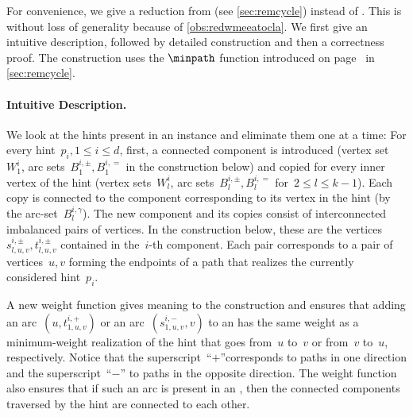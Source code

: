 For convenience, we give a reduction from \pWMEECLAs{} (see \autoref{sec:remcycle}) instead of \pWMEEAs{}. This is without loss of generality because of \autoref{obs:redwmeeatocla}. We first give an intuitive description, followed by detailed construction and then a correctness proof. The construction uses the $\minpath$ function introduced on page~\pageref{def:minpath} in \autoref{sec:remcycle}.

\paragraph{Intuitive Description.} We look at the hints present in an \pWMEECLAs{} instance and eliminate them one at a time: For every hint~$p_i, 1 \leq i \leq d$, first, a connected component is introduced (vertex set~$W^i_1$, arc sets~$B_1^{i,\pm}, B_1^{i,=}$ in the construction below) and copied for every inner vertex of the hint (vertex sets~$W^i_l$, arc sets~$B_l^{i,\pm}, B_l^{i,=}$ for~$2\leq l \leq k-1$). Each copy is connected to the component corresponding to its vertex in the hint (by the arc-set~$B_l^{i, \gamma}$). The new component and its copies consist of interconnected imbalanced pairs of vertices. In the construction below, these are the vertices~$s^{i,\pm}_{l, u,v},t^{i,\pm}_{l, u,v}$ contained in the~$i$-th component. Each pair corresponds to a pair of vertices~$u,v$ forming the endpoints of a path that realizes the currently considered hint~$p_i$.

 A new weight function gives meaning to the construction and ensures that adding an arc~$(u, t^{i,+}_{1, u, v})$ or an arc~$(s^{i,-}_{1, u, v}, v)$ to an \EE{} has the same weight as a minimum-weight realization of the hint that goes from~$u$ to~$v$ or from~$v$ to~$u$, respectively. Notice that the superscript~``$+$''corresponds to paths in one direction and the superscript~``$-$'' to paths in the opposite direction. The weight function also ensures that if such an arc is present in an \EE{}, then the connected components traversed by the hint are connected to each other.

